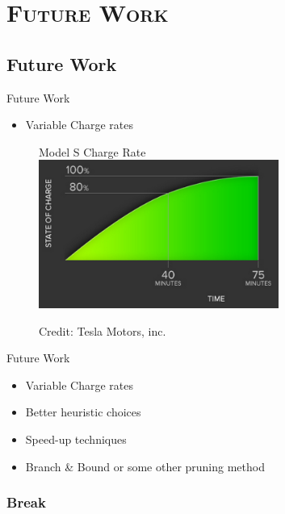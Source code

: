 \section{\scshape Future Work}
\subsection{Future Work}
\begin{frame}{Future Work}
\begin{itemize}
\item Variable Charge rates
\end{itemize}
\begin{figure}[h!]
  \centering
  Model S Charge Rate
    \includegraphics[width=0.7\textwidth]{images/chargerate}
  
      \tiny Credit: Tesla Motors, inc.
\end{figure}
\vspace{10cm}
\end{frame}

\begin{frame}{Future Work}
\begin{itemize}
\item Variable Charge rates
\item Better heuristic choices
\item Speed-up techniques
\item Branch \& Bound or some other pruning method
\end{itemize}
\vspace{10cm}
\end{frame}

\begin{frame}
\begin{center}
\frametitle{Break}
\end{center}
\end{frame}
